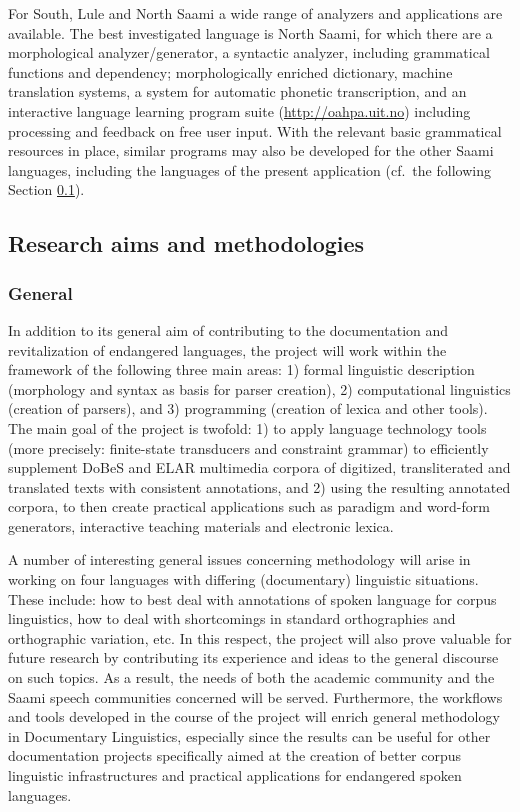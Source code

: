 \documentclass[a4paper,12pt]{article}
\begin{document}
For South, Lule and North Saami a wide range of analyzers and applications are available. The best investigated language is North Saami, for which there are a morphological analyzer/generator, a syntactic analyzer, including grammatical functions and dependency; morphologically enriched dictionary, machine translation systems, a system for automatic phonetic transcription, and an interactive language learning program suite (\url{http://oahpa.uit.no}) including processing and feedback on free user input. With the relevant basic grammatical resources in place, similar programs may also be developed for the other Saami languages, including the languages of the present application (cf.~the following Section \ref{method}).

\subsection{Research aims and methodologies}\label{method}
\subsubsection{General}%

In addition to its general aim of contributing to the documentation and revitalization of endangered languages, the project will work within the framework of the following three main areas: 1) formal linguistic description (morphology and syntax as basis for parser creation), 2) computational linguistics (creation of parsers), and 3) programming (creation of lexica and other tools). The main goal of the project is twofold: 1) to apply language technology tools (more precisely: finite-state transducers and constraint grammar) to efficiently supplement DoBeS and ELAR multimedia corpora of digitized, transliterated and translated texts with consistent annotations, and 2) using the resulting annotated corpora, to then create practical applications such as paradigm and word-form generators, interactive teaching materials and electronic lexica. 

A number of interesting general issues concerning methodology will arise in working on four languages with differing (documentary) linguistic situations. These include: how to best deal with annotations of spoken language for corpus linguistics, how to deal with shortcomings in standard orthographies and orthographic variation, etc. In this respect, the project will also prove valuable for future research by contributing its experience and ideas to the general discourse on such topics. As a result, the needs of both the academic community and the Saami speech communities concerned will be served. Furthermore, the workflows and tools developed in the course of the project will enrich general methodology in Documentary Linguistics, especially since the results can be useful for other documentation projects specifically aimed at the creation of better corpus linguistic infrastructures and practical applications for endangered spoken languages.
\end{document}
